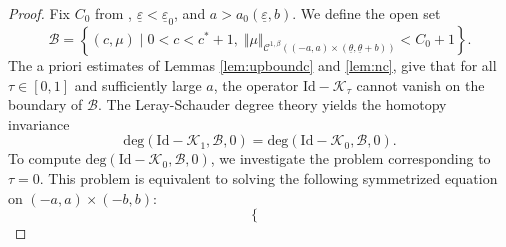 \documentclass[11pt]{article}    %
\renewcommand{\epsilon}{\varepsilon}
\newcommand{\eps}{\varepsilon}
\begin{document}
\begin{proof}
Fix $C_0$ from , $\underline\epsilon < \underline\epsilon_0$, and $a > a_0(\underline\epsilon,b)$.  We define the open set
\begin{equation*}
\mathcal{B} = \left \lbrace (c,\mu) \; \vert \; 0 < c < c^* + 1, \; \Vert \mu \Vert_{\mathcal{C}^{1,\beta}\left( (-a,a) \times (\underline\theta, \underline\theta + b)\right)} < C_0 + 1 \right\rbrace.
\end{equation*} 
The a priori estimates of Lemmas \ref{lem:upboundc} and \ref{lem:nc}, give that for all $\tau \in \left[ 0 , 1\right]$ and sufficiently large $a$, the operator $ \text{Id}  - \mathcal{K}_{\tau}$ cannot vanish on the boundary of $\mathcal{B}$. 
The Leray-Schauder degree theory yields the homotopy invariance
\begin{equation*}
	\text{deg}\left( \text{Id} - \mathcal{K}_{1} , \mathcal{B} , 0 \right) 
		= \text{deg}\left(  \text{Id} - \mathcal{K}_{0} , \mathcal{B} , 0 \right).
\end{equation*}
To compute $\text{deg}\left(  \text{Id} - \mathcal{K}_{0} , \mathcal{B} , 0 \right)$, we investigate the problem corresponding to $\tau = 0$.
This problem is equivalent to solving the following symmetrized equation on $(-a,a)\times(-b,b)$:
\begin{equation*}
\begin{cases}

\end{cases}
\end{equation*}
\end{proof}
\end{document}

